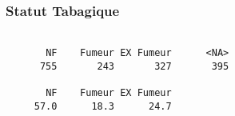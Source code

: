 \documentclass[11pt,a4paper]{article}\usepackage[]{graphicx}\usepackage[]{color}
\makeatletter
\newenvironment{kframe}{%
 \def\at@end@of@kframe{}%
 \ifinner\ifhmode%
  \def\at@end@of@kframe{\end{minipage}}%
  \begin{minipage}{\columnwidth}%
 \fi\fi%
 \def\FrameCommand##1{\hskip\@totalleftmargin \hskip-\fboxsep
 \colorbox{shadecolor}{##1}\hskip-\fboxsep
     \hskip-\linewidth \hskip-\@totalleftmargin \hskip\columnwidth}%
 \MakeFramed {\advance\hsize-\width
   \@totalleftmargin\z@ \linewidth\hsize
   \@setminipage}}%
 {\par\unskip\endMakeFramed%
 \at@end@of@kframe}
\newenvironment{knitrout}{}{} %
\makeatother
\begin{document}
    \subsubsection{Statut Tabagique}

\begin{knitrout}
\color{fgcolor}\begin{kframe}
\begin{verbatim}

       NF    Fumeur EX Fumeur      <NA> 
      755       243       327       395 

       NF    Fumeur EX Fumeur 
     57.0      18.3      24.7 
\end{verbatim}
\end{kframe}
\end{knitrout}
\end{document}
